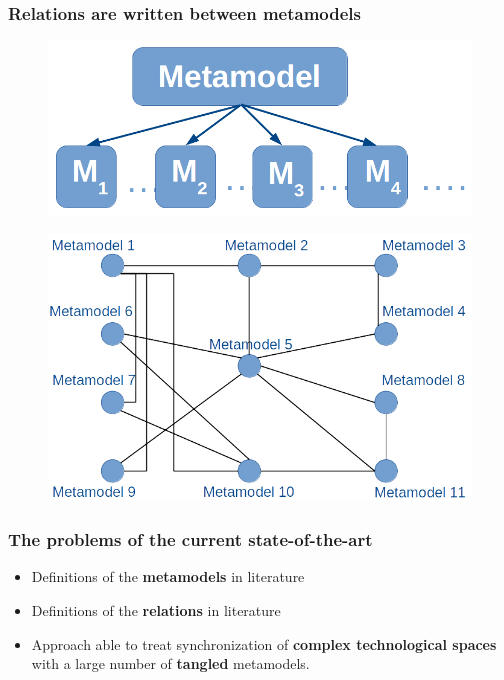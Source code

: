 \documentclass{beamer}
\begin{document}
\begin{frame}[t]
	\frametitle{Relations are written between metamodels}
	\begin{figure}
		\includegraphics[scale=0.14]{metamodels_generic}
	\end{figure}
	\pause
	\vskip -10pt
	\begin{figure}
		\includegraphics[scale=0.30]{network_metamodels_generic}
	\end{figure}
\end{frame}

\begin{frame}
	\frametitle{The problems of the current state-of-the-art}
	\begin{itemize}
		\item Definitions of the \textbf{metamodels} in literature
		\pause
		\item Definitions of the \textbf{relations} in literature
		\pause
		\item Approach able to treat synchronization of \textbf{complex technological spaces} with a large number of \textbf{tangled} metamodels.
	\end{itemize}
\end{frame}
\end{document}
